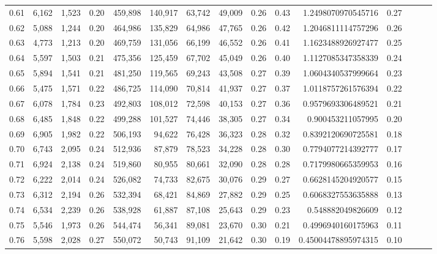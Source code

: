 \begin{tabular}{rrrrrrrrrrrrrrr}
0.61 &   6,162 &  1,523 &  0.20 &  459,898 &  140,917 &   63,742 &   49,009 &  0.26 &  0.43 &    1.2498070970545716 &      0.27 \\
0.62 &   5,088 &  1,244 &  0.20 &  464,986 &  135,829 &   64,986 &   47,765 &  0.26 &  0.42 &    1.2046811114757296 &      0.26 \\
0.63 &   4,773 &  1,213 &  0.20 &  469,759 &  131,056 &   66,199 &   46,552 &  0.26 &  0.41 &    1.1623488926927477 &      0.25 \\
0.64 &   5,597 &  1,503 &  0.21 &  475,356 &  125,459 &   67,702 &   45,049 &  0.26 &  0.40 &    1.1127085347358339 &      0.24 \\
0.65 &   5,894 &  1,541 &  0.21 &  481,250 &  119,565 &   69,243 &   43,508 &  0.27 &  0.39 &    1.0604340537999664 &      0.23 \\
0.66 &   5,475 &  1,571 &  0.22 &  486,725 &  114,090 &   70,814 &   41,937 &  0.27 &  0.37 &    1.0118757261576394 &      0.22 \\
0.67 &   6,078 &  1,784 &  0.23 &  492,803 &  108,012 &   72,598 &   40,153 &  0.27 &  0.36 &    0.9579693306489521 &      0.21 \\
0.68 &   6,485 &  1,848 &  0.22 &  499,288 &  101,527 &   74,446 &   38,305 &  0.27 &  0.34 &     0.900453211057995 &      0.20 \\
0.69 &   6,905 &  1,982 &  0.22 &  506,193 &   94,622 &   76,428 &   36,323 &  0.28 &  0.32 &    0.8392120690725581 &      0.18 \\
0.70 &   6,743 &  2,095 &  0.24 &  512,936 &   87,879 &   78,523 &   34,228 &  0.28 &  0.30 &    0.7794077214392777 &      0.17 \\
0.71 &   6,924 &  2,138 &  0.24 &  519,860 &   80,955 &   80,661 &   32,090 &  0.28 &  0.28 &    0.7179980665359953 &      0.16 \\
0.72 &   6,222 &  2,014 &  0.24 &  526,082 &   74,733 &   82,675 &   30,076 &  0.29 &  0.27 &    0.6628145204920577 &      0.15 \\
0.73 &   6,312 &  2,194 &  0.26 &  532,394 &   68,421 &   84,869 &   27,882 &  0.29 &  0.25 &    0.6068327553635888 &      0.13 \\
0.74 &   6,534 &  2,239 &  0.26 &  538,928 &   61,887 &   87,108 &   25,643 &  0.29 &  0.23 &     0.548882049826609 &      0.12 \\
0.75 &   5,546 &  1,973 &  0.26 &  544,474 &   56,341 &   89,081 &   23,670 &  0.30 &  0.21 &    0.4996940160175963 &      0.11 \\
0.76 &   5,598 &  2,028 &  0.27 &  550,072 &   50,743 &   91,109 &   21,642 &  0.30 &  0.19 &   0.45004478895974315 &      0.10 \\

\end{tabular}
